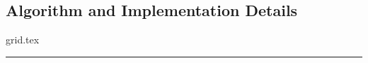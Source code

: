 \documentclass[12pt,twocolumn]{extarticle}
\begin{document}
\subsection{Algorithm and Implementation Details}
{grid.tex}
\hrule
\end{document}
